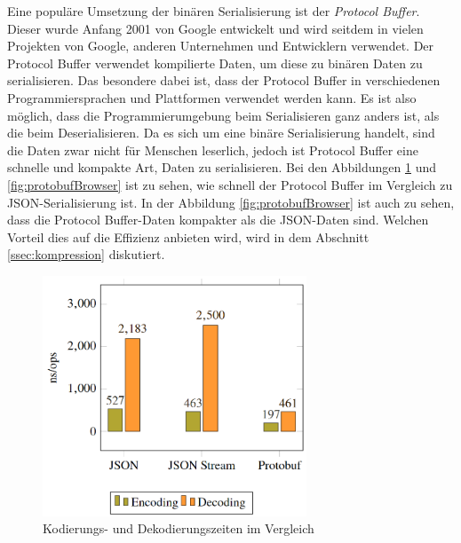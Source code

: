 
Eine populäre Umsetzung der binären Serialisierung ist der \textit{Protocol Buffer}. Dieser wurde Anfang 2001 von Google entwickelt und wird seitdem in vielen Projekten von Google, anderen Unternehmen und Entwicklern verwendet. Der Protocol Buffer verwendet kompilierte Daten, um diese zu binären Daten zu serialisieren. Das besondere dabei ist, dass der Protocol Buffer in verschiedenen Programmiersprachen und Plattformen verwendet werden kann. Es ist also möglich, dass die Programmierumgebung beim Serialisieren ganz anders ist, als die beim Deserialisieren. Da es sich um eine binäre Serialisierung handelt, sind die Daten zwar nicht für Menschen leserlich, jedoch ist Protocol Buffer eine schnelle und kompakte Art, Daten zu serialisieren. Bei den Abbildungen \ref{fig:protobufTime} und \ref{fig:protobufBrowser} ist zu sehen, wie schnell der Protocol Buffer im Vergleich zu JSON-Serialisierung ist.  In der Abbildung \ref{fig:protobufBrowser} ist auch zu sehen, dass die Protocol Buffer-Daten kompakter als die JSON-Daten sind. Welchen Vorteil dies auf die Effizienz anbieten wird, wird in dem Abschnitt \ref{ssec:kompression} diskutiert.\cite{currier2022protocol}

\begin{figure}[htp]
    \centering
    \includegraphics[width=0.7\textwidth]{images/protobuf_time.png}
    \caption{Kodierungs- und Dekodierungszeiten im Vergleich\cite{currier2022protocol}}
    \label{fig:protobufTime}
\end{figure}

